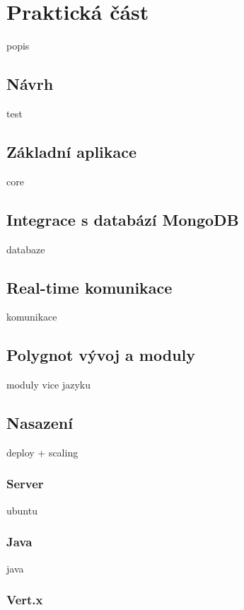 
\chapter{Praktická část}

popis

\section{Návrh}

test

\section{Základní aplikace}

core

\section{Integrace s databází MongoDB}

databaze

\section{Real-time komunikace}

komunikace

\section{Polygnot vývoj a moduly}

moduly vice jazyku

\section{Nasazení}

deploy + scaling

\subsection{Server}

ubuntu

\subsection{Java}

java

\subsection{Vert.x}

